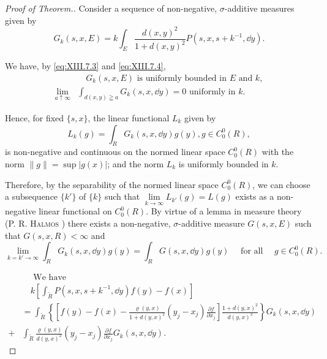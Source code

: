 \begin{proof}[Proof of Theorem.]
Consider a sequence of non-negative, $\sigma$-additive measures given by
\begin{equation}\label{eq:XIII.7.10}
G _{k} (s, x, E) = k \int_{E} \frac {d (x , y) ^{2}}{1 + d (x , y) ^{2}} P (s, x, s + k ^{-1}, \dd y).
\end{equation}

We have, by \eqref{eq:XIII.7.3} and \eqref{eq:XIII.7.4}, 
\begin{align}
&\quad G _{k} (s, x, E) \text{ is uniformly bounded in } E \text{ and } k, \label{eq:XIII.7.11} \\
\lim\limits _{a \uparrow \infty}& \int_{d (x, y) \geqq a} G _{k} (s, x, \dd y) = 0 \text{ uniformly in } k. \label{eq:XIII.7.12}
\end{align}

Hence, for fixed $\{s, x\}$, the linear functional $L_{k}$ given by 
\[
L _{k} (g) = \int_{R} G _{k} (s, x, \dd y) g (y), g \in C _{0} ^{0} (R),
\]
is non-negative and continuous on the normed linear space $C_{0}^{0}(R)$ with the norm $\|g\|=\sup |g(x)|$; and the norm $L_{k}$ is uniformly bounded in $k$. 

Therefore, by the separability of the normed linear space $C_0^0 (R)$, we can choose a subsequence $\{k'\}$ of $\{k\}$ such that $\lim\limits_{k\to \infty}L_{k'}(g) = L(g)$ exists as a non-negative linear functional on $C_0^0 (R)$. By virtue of a lemma in measure theory (P. R. \textsc{Halmos} \cite{halmos92}) there exists a non-negative, $\sigma$-additive measure $G(s,x,E)$ such that $G(s,x,R) < \infty$ and 
\begin{equation}\label{eq:XIII.7.13}
\lim\limits_{k = k' \to \infty} \int_{R} G_k(s, x, \dd y) g(y) = \int_{R} G(s, x, \dd y) g(y) \quad \text{ for all } \quad g \in C_0^0(R).
\end{equation}

\begin{equation}\label{eq:XIII.7.14}
\begin{aligned}
&\quad \text{ We have }
\\
&\quad k \left[ \int_ {\tilde {R}} P (s, x, s + k ^{-1}, \dd y) f (y) - f (x) \right]
\\
&= \int_ {\tilde {R}} \left\{\left[ f (y) - f (x) - \frac {\varrho (y , x)}{1 + d (y , x) ^{2}} (y _{j} - x _{j}) \frac {\partial f}{\partial x _{j}} \right] \frac {1 + d (y , x) ^{2}}{d (y , x) ^{2}} \right\} G _{k} (s, x, \dd y)
\\
+& \int_ {\tilde {R}} \frac {\varrho (y , x)}{d (y , x) ^{2}} (y _{j} - x _{j}) \frac {\partial f}{\partial x _{j}} G _{k} (s, x, \dd y).
\end{aligned}
\end{equation}


\end{proof}
